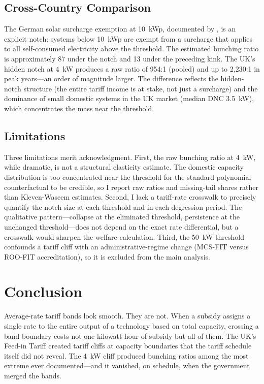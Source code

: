\documentclass[12pt]{article}
\begin{document}
\subsection{Cross-Country Comparison}

The German solar surcharge exemption at 10~kWp, documented by \citet{klimsa2024tax}, is an explicit notch: systems below 10~kWp are exempt from a surcharge that applies to all self-consumed electricity above the threshold. The estimated bunching ratio is approximately 87 under the notch and 13 under the preceding kink. The UK's hidden notch at 4~kW produces a raw ratio of 954:1 (pooled) and up to 2,230:1 in peak years---an order of magnitude larger. The difference reflects the hidden-notch structure (the entire tariff income is at stake, not just a surcharge) and the dominance of small domestic systems in the UK market (median DNC 3.5~kW), which concentrates the mass near the threshold.

\subsection{Limitations}

Three limitations merit acknowledgment. First, the raw bunching ratio at 4~kW, while dramatic, is not a structural elasticity estimate. The domestic capacity distribution is too concentrated near the threshold for the standard polynomial counterfactual to be credible, so I report raw ratios and missing-tail shares rather than Kleven-Waseem estimates. Second, I lack a tariff-rate crosswalk to precisely quantify the notch size at each threshold and in each degression period. The qualitative pattern---collapse at the eliminated threshold, persistence at the unchanged threshold---does not depend on the exact rate differential, but a crosswalk would sharpen the welfare calculation. Third, the 50~kW threshold confounds a tariff cliff with an administrative-regime change (MCS-FIT versus ROO-FIT accreditation), so it is excluded from the main analysis.


\section{Conclusion}
\label{sec:conclusion}

Average-rate tariff bands look smooth. They are not. When a subsidy assigns a single rate to the entire output of a technology based on total capacity, crossing a band boundary costs not one kilowatt-hour of subsidy but all of them. The UK's Feed-in Tariff created tariff cliffs at capacity boundaries that the tariff schedule itself did not reveal. The 4~kW cliff produced bunching ratios among the most extreme ever documented---and it vanished, on schedule, when the government merged the bands.
\end{document}
